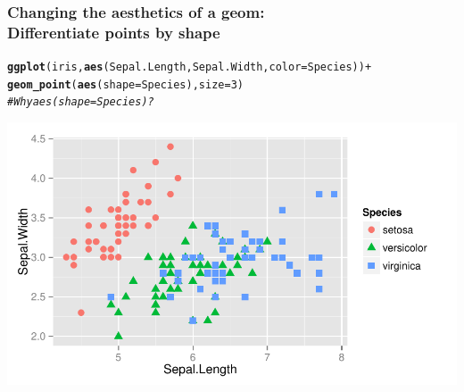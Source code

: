 \documentclass{beamer}\usepackage[]{graphicx}\usepackage[]{color}
\makeatletter
\newcommand{\hlnum}[1]{\textcolor[rgb]{0.686,0.059,0.569}{#1}}%
\newcommand{\hlcom}[1]{\textcolor[rgb]{0.678,0.584,0.686}{\textit{#1}}}%
\newcommand{\hlopt}[1]{\textcolor[rgb]{0,0,0}{#1}}%
\newcommand{\hlstd}[1]{\textcolor[rgb]{0.345,0.345,0.345}{#1}}%
\newcommand{\hlkwc}[1]{\textcolor[rgb]{0.333,0.667,0.333}{#1}}%
\newcommand{\hlkwd}[1]{\textcolor[rgb]{0.737,0.353,0.396}{\textbf{#1}}}%
\newenvironment{kframe}{%
 \def\at@end@of@kframe{}%
 \ifinner\ifhmode%
  \def\at@end@of@kframe{\end{minipage}}%
  \begin{minipage}{\columnwidth}%
 \fi\fi%
 \def\FrameCommand##1{\hskip\@totalleftmargin \hskip-\fboxsep
 \colorbox{shadecolor}{##1}\hskip-\fboxsep
     \hskip-\linewidth \hskip-\@totalleftmargin \hskip\columnwidth}%
 \MakeFramed {\advance\hsize-\width
   \@totalleftmargin\z@ \linewidth\hsize
   \@setminipage}}%
 {\par\unskip\endMakeFramed%
 \at@end@of@kframe}
\newenvironment{knitrout}{}{} %
\makeatother
\begin{document}
\begin{frame}[fragile]
\frametitle{Changing the aesthetics of a geom: \\Differentiate points by shape}
\begin{knitrout}\footnotesize
{}\color{fgcolor}\begin{kframe}
\begin{alltt}
\hlkwd{ggplot}\hlstd{(iris,} \hlkwd{aes}\hlstd{(Sepal.Length, Sepal.Width,} \hlkwc{color} \hlstd{= Species))} \hlopt{+}
\hlkwd{geom_point}\hlstd{(}\hlkwd{aes}\hlstd{(}\hlkwc{shape} \hlstd{= Species),} \hlkwc{size} \hlstd{=} \hlnum{3}\hlstd{)}
\hlcom{# Why aes(shape = Species)?}
\end{alltt}
\end{kframe}

{\centering \includegraphics[width=.75\linewidth]{figure/first_plot_shape_} 

}



\end{knitrout}

\end{frame}

\end{document}
